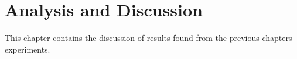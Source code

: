 \chapter{Analysis and Discussion}

This chapter contains the discussion of results found from the previous chapters experiments.



